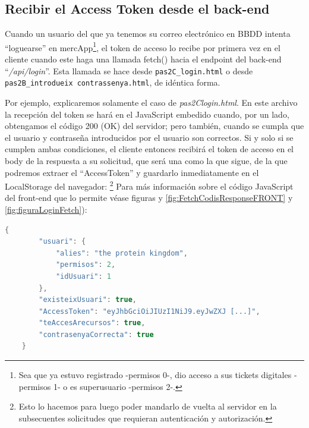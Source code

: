 \documentclass[a4paper,12pt]{report}
\begin{document}
	\subsection{Recibir el Access Token desde el back-end}
	\label{sec:recibirAccesTokenENFRONTEND}
	
	Cuando un usuario del que ya tenemos su correo electrónico en BBDD intenta ``loguearse'' en mercApp\footnote{Sea que ya estuvo registrado -permisos 0-, dio acceso a sus tickets digitales -permisos 1- o es superusuario -permisos 2-.}, el token de acceso lo recibe por primera vez en el cliente cuando este haga una llamada fetch() hacia el endpoint del back-end ``\textit{/api/login}''. Esta llamada se hace desde \texttt{pas2C\_login.html} o desde \texttt{pas2B\_introdueix contrassenya.html}, de idéntica forma.
	
	
	Por ejemplo, explicaremos solamente el caso de \textit{pas2Clogin.html}. En este archivo la recepción del token se hará en el JavaScript embedido cuando, por un lado, obtengamos el código 200 (OK) del servidor; pero también, cuando se cumpla que el usuario y contraseña introducidos por el usuario son correctos. Si y solo si se cumplen ambas condiciones, el cliente entonces recibirá el token de acceso en el body de la respuesta a su solicitud, que será una como la que sigue, de la que podremos extraer el ``AccessToken'' y guardarlo inmediatamente en el LocalStorage del navegador: \footnote{Esto lo hacemos para luego poder mandarlo de vuelta al servidor en la subsecuentes solicitudes que requieran autenticación y autorización.} Para más información sobre el código JavaScript del front-end que lo permite véase figuras y \ref{fig:FetchCodisResponseFRONT} y \ref{fig:figuraLoginFetch}):
	
\begin{lstlisting}[language=Java, basicstyle=\ttfamily\footnotesize, keywordstyle=\color{magenta}]
	{
		"usuari": {
			"alies": "the protein kingdom",
			"permisos": 2,
			"idUsuari": 1
		},
		"existeixUsuari": true,
		"AccessToken": "eyJhbGciOiJIUzI1NiJ9.eyJwZXJ [...]",
		"teAccesArecursos": true,
		"contrasenyaCorrecta": true
	}
\end{lstlisting}
	
\end{document}
